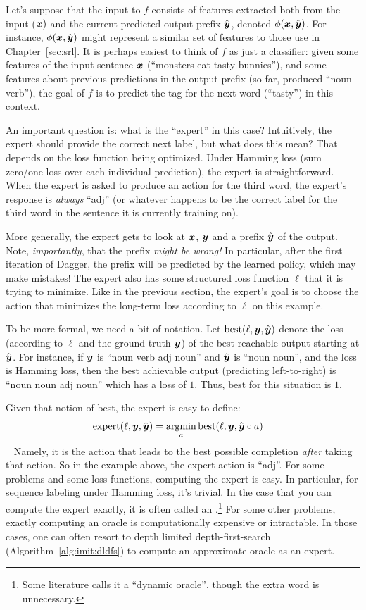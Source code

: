 Let's suppose that the input to $f$ consists of features extracted both from the input (${\boldsymbol{x}})$ and the current predicted output prefix $\hat{{\boldsymbol{y}}}$, denoted $\phi({\boldsymbol{x}}, \hat{{\boldsymbol{y}}})$.
For instance, $\phi({\boldsymbol{x}},\hat{{\boldsymbol{y}}})$ might represent a similar set of features to those use in Chapter~\ref{sec:srl}.
It is perhaps easiest to think of $f$ as just a classifier:
given some features of the input sentence ${\boldsymbol{x}}$ (``monsters eat tasty bunnies''),
and some features about previous predictions in the output prefix (so far, produced ``noun verb''),
the goal of $f$ is to predict the tag for the next word (``tasty'') in this context.

An important question is: what is the ``expert'' in this case?
Intuitively, the expert should provide the correct next label, but what does this mean?
That depends on the loss function being optimized.
Under Hamming loss (sum zero/one loss over each individual prediction), the expert is straightforward.
When the expert is asked to produce an action for the third word, the expert's response is \emph{always} ``adj'' (or whatever happens to be the correct label for the third word in the sentence it is currently training on).

More generally, the expert gets to look at ${\boldsymbol{x}}$, ${\boldsymbol{y}}$ and a prefix $\hat{{\boldsymbol{y}}}$ of the output.
Note, \emph{importantly}, that the prefix \emph{might be wrong!}
In particular, after the first iteration of Dagger, the prefix will be predicted by the learned policy, which may make mistakes!
The expert also has some structured loss function $\ell$ that it is trying to minimize.
Like in the previous section, the expert's goal is to choose the action that minimizes the long-term loss according to $\ell$ on this example.

To be more formal, we need a bit of notation.
Let $\text{best}(\ell, {\boldsymbol{y}}, \hat{{\boldsymbol{y}}})$ denote the loss (according to $\ell$ and the ground truth ${\boldsymbol{y}}$) of the best reachable output starting at $\hat{{\boldsymbol{y}}}$.
For instance, if ${\boldsymbol{y}}$ is ``noun verb adj noun'' and $\hat{{\boldsymbol{y}}}$ is ``noun noun'', and the loss is Hamming loss, then the best achievable output (predicting left-to-right) is ``noun noun adj noun'' which has a loss of $1$.
Thus, $\text{best}$ for this situation is $1$.

Given that notion of best, the expert is easy to define:
~
\begin{align}
  \text{expert}(\ell, \vy, \hat\vy)
  &= \argmin_a \text{best}(\ell, \vy, \hat\vy \circ a)
\end{align}
~
Namely, it is the action that leads to the best possible completion \emph{after} taking that action.
So in the example above, the expert action is ``adj''.
For some problems and some loss functions, computing the expert is easy.
In particular, for sequence labeling under Hamming loss, it's trivial.
In the case that you can compute the expert exactly, it is often called an .\footnote{Some literature calls it a ``dynamic oracle'', though the extra word is unnecessary.}
For some other problems, exactly computing an oracle is computationally expensive or intractable.
In those cases, one can often resort to depth limited depth-first-search (Algorithm~\ref{alg:imit:dldfs}) to compute an approximate oracle as an expert.

